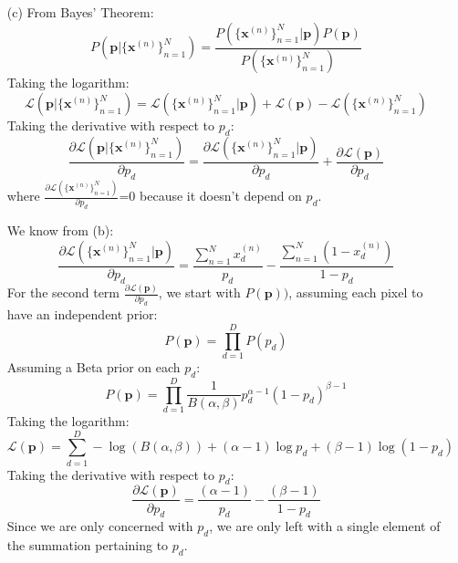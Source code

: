 \documentclass[12pt]{article}
\begin{document}
\begin{enumerate}
%
%

\item[(c)] From Bayes' Theorem:
$$P(\textbf{p}|\{\textbf{x}^{(n)}\}_{n=1}^N) = \frac{ P(\{\textbf{x}^{(n)}\}_{n=1}^N|\textbf{p})P(\textbf{p})}{P(\{\textbf{x}^{(n)}\}_{n=1}^N)}$$
Taking the logarithm:
$$\mathcal{L}(\textbf{p}|\{\textbf{x}^{(n)}\}_{n=1}^N) = \mathcal{L}(\{\textbf{x}^{(n)}\}_{n=1}^N|\textbf{p})+ \mathcal{L}(\textbf{p}) - \mathcal{L}(\{\textbf{x}^{(n)}\}_{n=1}^N)$$
Taking the derivative with respect to $p_d$:
$$\frac{\partial\mathcal{L}(\textbf{p}|\{\textbf{x}^{(n)}\}_{n=1}^N)}{\partial p_d} = \frac{\partial\mathcal{L}(\{\textbf{x}^{(n)}\}_{n=1}^N|\textbf{p})}{\partial p_d} + \frac{\partial\mathcal{L}(\textbf{p})}{\partial p_d}$$
where $\frac{\partial\mathcal{L}(\{\textbf{x}^{(n)}\}_{n=1}^N)}{\partial p_d}$=0 because it doesn't depend on $p_d$.

We know from (b):
$$\frac{\partial\mathcal{L}(\{\textbf{x}^{(n)}\}_{n=1}^N|\textbf{p})}{\partial p_d} = \frac{\sum_{n=1}^{N} x_d^{(n)}}{p_d} -  \frac{\sum_{n=1}^{N} (1-x_d^{(n)})}{1-p_d}$$
For the second term $\frac{\partial\mathcal{L}(\textbf{p})}{\partial p_d}$, we start with $P(\textbf{p}))$, assuming each pixel to have an independent prior:
$$P(\textbf{p}) = \prod_{d=1}^D P(p_d)$$
Assuming a Beta prior on each $p_d$:
$$P(\textbf{p}) = \prod_{d=1}^D \frac{1}{B(\alpha, \beta)} p^{\alpha-1}_d (1-p_d)^{\beta-1}$$
Taking the logarithm:
$$\mathcal{L}(\textbf{p}) = \sum_{d=1}^{D} -\log (B(\alpha, \beta)) + (\alpha-1)\log p_d + (\beta-1)\log(1-p_d)$$
Taking the derivative with respect to $p_d$:
$$\frac{\partial\mathcal{L}(\textbf{p})}{\partial p_d} = \frac{(\alpha-1)}{p_d} -  \frac{(\beta-1)}{1-p_d}$$
Since we are only concerned with $p_d$, we are only left with a single element of the summation pertaining to $p_d$.



\end{enumerate}
\end{document}

